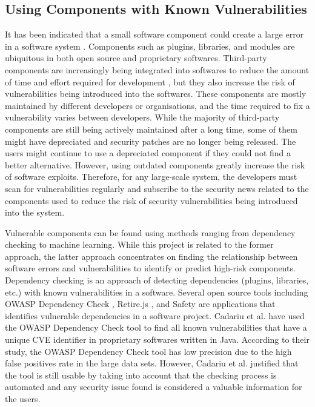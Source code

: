 \documentclass[12pt, a4paper]{report}
\begin{document}
\subsection{Using Components with Known Vulnerabilities} \label{subsec:components}
It has been indicated that a small software component could create a large error in a software
system \cite{basili_1984, munson_1992, selby_1988}. Components such as plugins, libraries, and
modules are ubiquitous in both open source and proprietary softwares. Third-party components are
increasingly being integrated into softwares to reduce the amount of time and effort required for
development \cite{balzarotti_2006}, but they also increase the risk of vulnerabilities being
introduced into the softwares. These components are mostly maintained by different developers or
organisations, and the time required to fix a vulnerability varies between developers. While the
majority of third-party components are still being actively maintained after a long time, some of
them might have depreciated and security patches are no longer being released. The users might
continue to use a depreciated component if they could not find a better alternative. However, using
outdated components greatly increase the risk of software exploits. Therefore, for any large-scale
system, the developers must scan for vulnerabilities regularly and subscribe to the security news
related to the components used to reduce the risk of security vulnerabilities being introduced into
the system.

Vulnerable components can be found using methods ranging from dependency checking to machine
learning. While this project is related to the former approach, the latter approach concentrates on
finding the relationship between software errors and vulnerabilities to identify or predict
high-risk components. Dependency checking is an approach of detecting dependencies (plugins,
libraries, etc.) with known vulnerabilities in a software. Several open source tools including OWASP
Dependency Check \cite{owasp_dependency}, Retire.js \cite{retirejs}, and Safety \cite{safety} are
applications that identifies vulnerable dependencies in a software project. Cadariu et al.
\cite{cadariu_2015} have used the OWASP Dependency Check tool to find all known vulnerabilities that
have a unique CVE identifier in proprietary softwares written in Java. According to their study, the
OWASP Dependency Check tool has low precision due to the high false positives rate in the large data
sets. However, Cadariu et al. justified that the tool is still usable by taking into account that
the checking process is automated and any security issue found is considered a valuable information
for the users.
\end{document}
